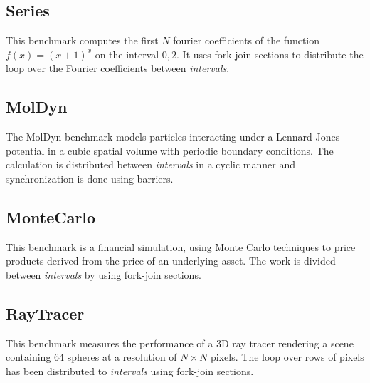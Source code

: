 \subsection*{Series}

This benchmark computes the first $N$ fourier coefficients of the
function $f(x) = (x+1)^x$ on the interval $0,2$. It uses fork-join
sections to distribute the loop over the Fourier coefficients between
\emph{intervals}.

\subsection*{MolDyn}

The MolDyn benchmark models particles interacting under a
Lennard-Jones potential in a cubic spatial volume with periodic
boundary conditions. The calculation is distributed between
\emph{intervals} in a cyclic manner and synchronization is done using
barriers.

\subsection*{MonteCarlo}

This benchmark is a financial simulation, using Monte Carlo techniques
to price products derived from the price of an underlying asset. The
work is divided between \emph{intervals} by using fork-join sections.

\subsection*{RayTracer}

This benchmark measures the performance of a 3D ray tracer rendering a
scene containing 64 spheres at a resolution of $N \times N$
pixels. The loop over rows of pixels has been distributed to
\emph{intervals} using fork-join sections.


